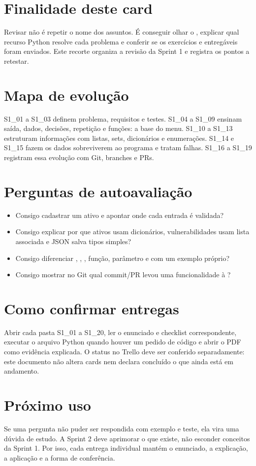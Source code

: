 \documentclass[11pt,a4paper]{article}
\begin{document}
\section*{Finalidade deste card}
Revisar não é repetir o nome dos assuntos. É conseguir olhar o , explicar qual recurso Python resolve cada problema e conferir se os exercícios e entregáveis foram enviados. Este recorte organiza a revisão da Sprint 1 e registra os pontos a retestar.
\section*{Mapa de evolução}
S1\_01 a S1\_03 definem problema, requisitos e testes. S1\_04 a S1\_09 ensinam saída, dados, decisões, repetição e funções: a base do menu. S1\_10 a S1\_13 estruturam informações com listas, sets, dicionários e enumerações. S1\_14 e S1\_15 fazem os dados sobreviverem ao programa e tratam falhas. S1\_16 a S1\_19 registram essa evolução com Git, branches e PRs.
\section*{Perguntas de autoavaliação}
\begin{itemize}
\item Consigo cadastrar um ativo e apontar onde cada entrada é validada?
\item Consigo explicar por que ativos usam dicionários, vulnerabilidades usam lista associada e JSON salva tipos simples?
\item Consigo diferenciar , , , função, parâmetro e  com um exemplo próprio?
\item Consigo mostrar no Git qual commit/PR levou uma funcionalidade à ?
\end{itemize}
\section*{Como confirmar entregas}
Abrir cada pasta S1\_01 a S1\_20, ler o enunciado e checklist correspondente, executar o arquivo Python quando houver um pedido de código e abrir o PDF como evidência explicada. O status no Trello deve ser conferido separadamente: este documento não altera cards nem declara concluído o que ainda está em andamento.
\section*{Próximo uso}
Se uma pergunta não puder ser respondida com exemplo e teste, ela vira uma dúvida de estudo. A Sprint 2 deve aprimorar o que existe, não esconder conceitos da Sprint 1. Por isso, cada entrega individual mantém o enunciado, a explicação, a aplicação e a forma de conferência.
\end{document}
